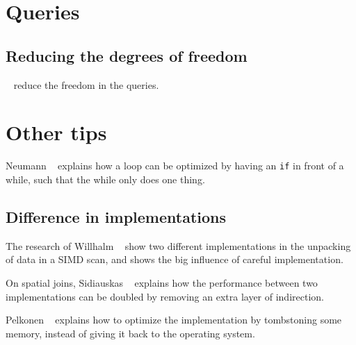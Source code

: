 \section{Queries}
\label{sec:Queries}

\subsection{Reducing the degrees of freedom}
\label{sub:Reducing the degrees of freedom}
\monetdb~\cite{Boncz2005-wj} reduce the freedom in the queries.


\section{Other tips}
\label{sec:Other tips}
Neumann \ea~\cite{Neumann2011-uq} explains how a loop can be optimized by having an \texttt{if} in front of a while, such that the while only does one thing.

\subsection{Difference in implementations}
\label{sub:Difference in implementations}
The research of Willhalm \ea~\cite{Willhalm2013-ri} show two different implementations in the unpacking of data in a SIMD scan, and shows the big influence of careful implementation.

On spatial joins, Sidiauskas \ea~\cite{Sidiauskas2014-ef} explains how the performance between two implementations can be doubled by removing an extra layer of indirection.

Pelkonen \ea~\cite{Pelkonen2015-ko} explains how to optimize the implementation by tombstoning some memory, instead of giving it back to the operating system.
